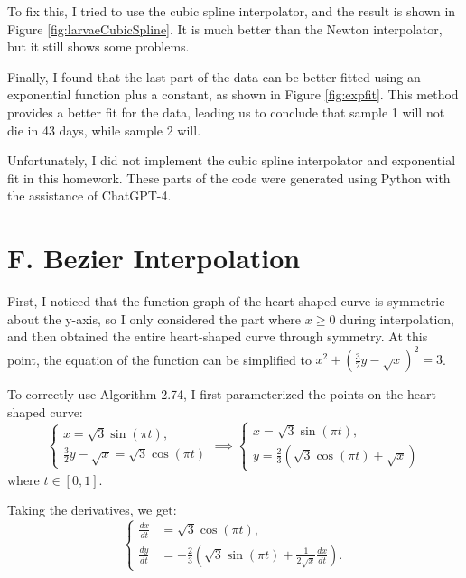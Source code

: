 \documentclass[a4paper]{article}
\begin{document}
To fix this, I tried to use the cubic spline interpolator, and the result is shown in Figure \ref{fig:larvaeCubicSpline}. It is much better than the Newton interpolator, but it still shows some problems.

Finally, I found that the last part of the data can be better fitted using an exponential function plus a constant, as shown in Figure \ref{fig:expfit}. This method provides a better fit for the data, leading us to conclude that sample 1 will not die in 43 days, while sample 2 will.

Unfortunately, I did not implement the cubic spline interpolator and exponential fit in this homework. These parts of the code were generated using Python with the assistance of ChatGPT-4.
\section{F. Bezier Interpolation}
First, I noticed that the function graph of the heart-shaped curve is symmetric about the y-axis, so I only considered the part where \( x \geq 0 \) during interpolation, and then obtained the entire heart-shaped curve through symmetry. At this point, the equation of the function can be simplified to \( x^2 + \left(\frac{3}{2}y - \sqrt{x}\right)^2 = 3 \).

To correctly use Algorithm 2.74, I first parameterized the points on the heart-shaped curve:
\[
\begin{cases}
  x = \sqrt{3} \sin(\pi t), \\
  \frac{3}{2}y - \sqrt{x} = \sqrt{3} \cos(\pi t)
\end{cases}
\implies
\begin{cases}
  x = \sqrt{3} \sin(\pi t), \\
  y = \frac{2}{3} \left( \sqrt{3} \cos(\pi t) + \sqrt{x} \right)
\end{cases}
\]
where \( t \in [0, 1] \).

Taking the derivatives, we get:
\[
\begin{cases}
  \frac{dx}{dt} &= \sqrt{3} \cos(\pi t), \\
  \frac{dy}{dt} &= -\frac{2}{3} \left( \sqrt{3} \sin(\pi t) + \frac{1}{2\sqrt{x}} \frac{dx}{dt} \right).
\end{cases}
\]
\end{document}

